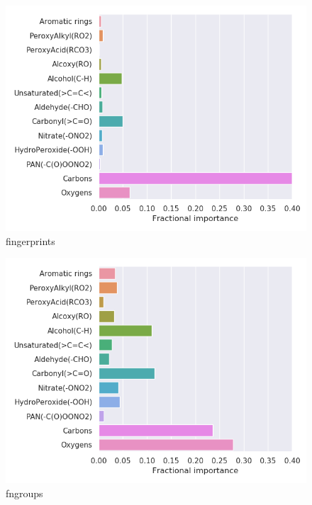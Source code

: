 \begin{subfigure}[b]{0.5\textwidth}
    \centering
    \includegraphics[width=\textwidth]{outputs/AE/fingerprints/legend.png}
    \caption{fingerprints}
    \label{fig:legend_AE_fingerprints}
\end{subfigure}
\begin{subfigure}[b]{0.5\textwidth}
    \centering
    \includegraphics[width=\textwidth]{outputs/AE/fngroups/legend.png}
    \caption{fngroups}
    \label{fig:legend_AE_fngroups}
\end{subfigure}
